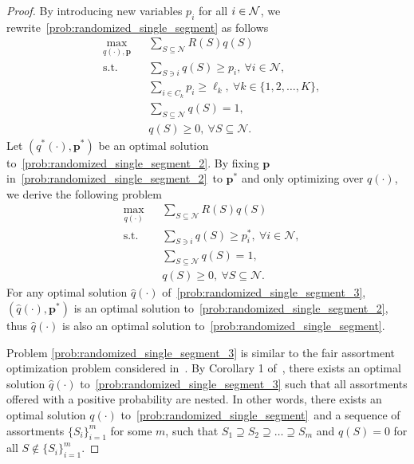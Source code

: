 \documentclass[msom,non-blindrev]{informs3} %
\theoremstyle{definition}
\begin{document}
\begin{proof}
By introducing new variables $p_i$ for all $i \in {\cal N}$,    we rewrite~\eqref{prob:randomized_single_segment} as follows
    \begin{equation}\label{prob:randomized_single_segment_2}
    \begin{aligned}
    &\max_{q(\cdot),\mathbf{p}}&&{\sum_{S\subseteq\mathcal{N}}R(S)q(S)}\\
    &\text{s.t.}&&{\sum_{S\ni i}q(S)\geq p_i,\ \forall i\in\mathcal{N},}\\
    &&&{\sum_{i\in C_k}p_i\geq \ell_k,\ \forall k\in\{1,2,\dots,K\},}\\
    &&&{\sum_{S\subseteq\mathcal{N}}q(S)=1,}\\
    &&&{q(S)\geq 0,\ \forall S\subseteq\mathcal{N}.}
    \end{aligned}
    \end{equation}
    Let $(q^*(\cdot),\mathbf{p}^*)$ be an optimal solution to~\eqref{prob:randomized_single_segment_2}. By fixing $\mathbf{p}$ in~\eqref{prob:randomized_single_segment_2}~to  $\mathbf{p}^*$ and only optimizing over $q(\cdot)$, we derive the following problem
    \begin{equation}\label{prob:randomized_single_segment_3}
    \begin{aligned}
    &\max_{q(\cdot)}&&{\sum_{S\subseteq\mathcal{N}}R(S)q(S)}\\
    &\text{s.t.}&&{\sum_{S\ni i}q(S)\geq p_i^*,\ \forall i\in\mathcal{N},}\\
    &&&{\sum_{S\subseteq\mathcal{N}}q(S)=1,}\\
    &&&{q(S)\geq 0,\ \forall S\subseteq\mathcal{N}.}
    \end{aligned}
    \end{equation}
    For any optimal solution $\hat{q}(\cdot)$ of~\eqref{prob:randomized_single_segment_3}, $(\hat{q}(\cdot),\mathbf{p}^*)$ is an optimal solution to~\eqref{prob:randomized_single_segment_2}, thus $\hat{q}(\cdot)$ is also an optimal solution to~\eqref{prob:randomized_single_segment}.

    Problem \eqref{prob:randomized_single_segment_3} is similar to the fair assortment optimization problem considered in~\cite{lu2023simple}. By Corollary 1 of~\cite{lu2023simple}, there exists an optimal solution $\hat{q}(\cdot)$ to~\eqref{prob:randomized_single_segment_3} such that all assortments offered with a positive probability are nested. In other words, there exists an optimal solution $q(\cdot)$ to~\eqref{prob:randomized_single_segment}~and a sequence of assortments $\{S_i\}_{i=1}^m$ for some $m$, such that $S_1\supseteq S_2\supseteq\dots\supseteq S_m$ and $q(S)=0$ for all $S\notin \{S_i\}_{i=1}^m$.
\end{proof}
\end{document}
